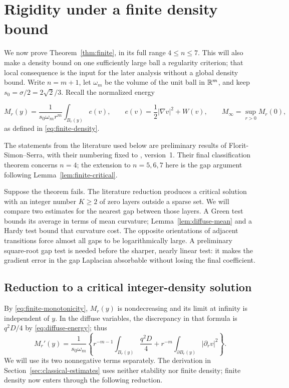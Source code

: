 \section{Rigidity under a finite density bound}\label{sec:finite}

We now prove Theorem~\ref{thm:finite}, in its full range $4\le n\le7$.
This will also make a density bound on one sufficiently large ball a
regularity criterion; that local consequence is the input for the later
analysis without a global density bound. Write $n=m+1$, let $\omega_m$
be the volume of the unit ball in $\mathbb R^m$, and keep
$s_0=\sigma/2=2\sqrt2/3$. Recall the normalized energy

\[
 M_r(y)=\frac{1}{s_0\omega_m r^m}\int_{B_r(y)}e(v),\qquad
 e(v)=\frac12|\nabla v|^2+W(v),\qquad
 M_\infty=\sup_{r>0}M_r(0),
\]
as defined in \eqref{eq:finite-density}.

The statements from the literature used below are preliminary results of
Florit-Simon--Serra, with their numbering fixed to
\cite{FSS2025}, version~1.  Their final classification theorem concerns
\(n=4\); the extension to \(n=5,6,7\) here is the gap argument following
Lemma~\ref{lem:finite-critical}.

Suppose the theorem fails. The literature reduction produces a critical
solution with an integer number $K\ge2$ of zero layers outside a sparse
set. We will compare two estimates for the nearest gap between those
layers. A Green test bounds its average in terms of mean curvature;
Lemma~\ref{lem:diffuse-mean} and a Hardy test bound that curvature cost.
The opposite orientations of adjacent transitions force almost all
gaps to be logarithmically large. A preliminary square-root gap test is
needed before the sharper, nearly linear test: it makes the gradient
error in the gap Laplacian absorbable without losing the final coefficient.

\subsection{Reduction to a critical integer-density solution}

By \eqref{eq:finite-monotonicity}, $M_r(y)$ is nondecreasing and
its limit at infinity is independent of $y$. In the diffuse variables,
the discrepancy in that formula is $q^2D/4$ by
\eqref{eq:diffuse-energy}; thus
\[
 M_r'(y)=\frac{1}{s_0\omega_m}
 \left\{r^{-m-1}\int_{B_r(y)}\frac{q^2D}{4}
       +r^{-m}\int_{\partial B_r(y)}|\partial_rv|^2\right\}.
\]
We will use its two nonnegative terms separately. The derivation in
Section~\ref{sec:classical-estimates} uses neither stability nor finite
density; finite density now enters through the following reduction.

